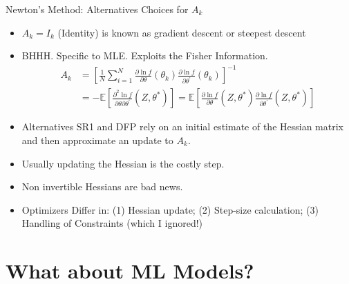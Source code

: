 \documentclass[aspectratio=169,11pt]{beamer}
\begin{document}
\begin{frame}{Newton's Method: Alternatives}
Choices for $A_k$
\begin{itemize}
\item $A_k= I_{k}$ (Identity) is known as \alert{gradient descent} or \alert{steepest descent}
\item BHHH. Specific to MLE. Exploits the \alert{Fisher Information}.
\begin{align*}
A _ { k } 
&= \left[ \frac { 1 } { N } \sum _ { i = 1 } ^ { N } \frac { \partial \ln f } { \partial \theta } \left( \theta _ { k } \right) \frac { \partial \ln f } { \partial \theta ^ { \prime } } \left( \theta _ { k } \right) \right] ^ { - 1 }\\
&=- \mathbb { E } \left[ \frac { \partial ^ { 2 } \ln f } { \partial \theta \partial \theta ^ { \prime } } \left( Z , \theta ^ { * } \right) \right] 
= \mathbb { E } \left[ \frac { \partial \ln f } { \partial \theta } \left( Z , \theta ^ { * } \right) \frac { \partial \ln f } { \partial \theta ^ { \prime } } \left( Z , \theta ^ { * } \right) \right]
\end{align*}
\item Alternatives \alert{SR1} and \alert{DFP} rely on an initial estimate of the Hessian matrix and then approximate an update to $A_k$.
\item Usually updating the Hessian is the costly step.
\item Non invertible Hessians are bad news.
\item Optimizers Differ in: (1) Hessian update; (2) Step-size calculation; (3) Handling of Constraints (which I ignored!)
\end{itemize}
\end{frame}

\section{What about ML Models?}
\end{document}
